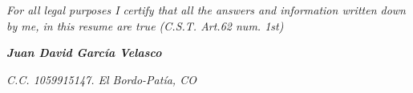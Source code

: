\documentclass[american]{cv-class}
\begin{document}
\vspace{0.5cm}
\begin{center}
	\emph{For all legal purposes I certify that all
the answers and information written down by me,
in this resume are true (C.S.T.
	Art.62 num. 1st)}
\end{center}

\begin{flushright}
\end{flushright}
\begin{flushright}
	\emph{\textbf{Juan David García Velasco}}
\end{flushright}
\begin{flushright}
	\emph{C.C. 1059915147. El Bordo-Patía, CO}
\end{flushright}
\end{document}
